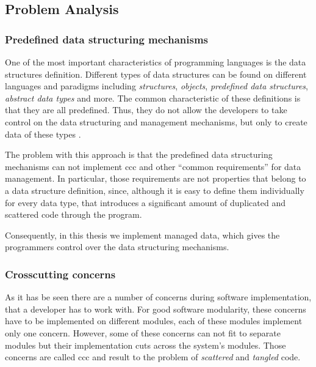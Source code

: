 \subsection{Problem Analysis}\label{Problem Analysis}

\subsubsection{Predefined data structuring mechanisms}\label{Predefined data structuring mechanisms problem}
One of the most important characteristics of programming languages is the data structures definition.
Different types of data structures can be found on different languages and paradigms including \textit{structures}, \textit{objects}, \textit{predefined data structures}, \textit{abstract data types} and more.
The common characteristic of these definitions is that they are all predefined. 
Thus, they do not allow the developers to take control on the data structuring and management mechanisms, but only to create data of these types \cite{loh2012managed}.

The problem with this approach is that the predefined data structuring mechanisms can not implement \acrlong{ccc} and other ``common requirements'' for data management. 
In particular, those requirements are not properties that belong to a data structure definition, since, although it is easy to define them individually for every data type, that introduces a significant amount of duplicated and scattered code through the program.

Consequently, in this thesis we implement managed data, which gives the programmers control over the data structuring mechanisms.

\subsubsection{Crosscutting concerns}\label{Cross cutting concerns problem}

As it has be seen \cite{hannemann2005role} there are a number of concerns during software implementation, that a developer has to work with. 
For good software modularity, these concerns have to be implemented on different modules, each of these modules implement only one concern.
However, some of these concerns can not fit to separate modules but their implementation cuts across the system's modules. 
Those concerns are called \acrlong{ccc} and result to the problem of \textit{scattered} and \textit{tangled} code. 

